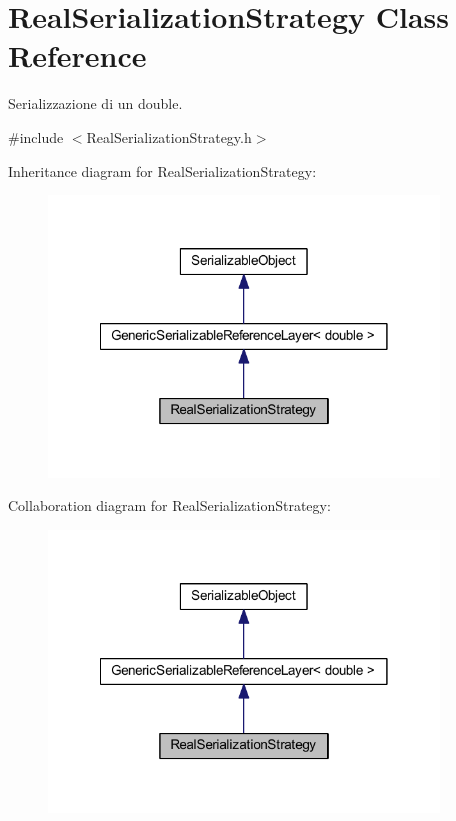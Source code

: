 \hypertarget{class_real_serialization_strategy}{
\section{RealSerializationStrategy Class Reference}
\label{class_real_serialization_strategy}
}


Serializzazione di un double.  




{\ttfamily \#include $<$RealSerializationStrategy.h$>$}



Inheritance diagram for RealSerializationStrategy:\nopagebreak
\begin{figure}[H]
\begin{center}
\leavevmode
\includegraphics[width=294pt]{class_real_serialization_strategy__inherit__graph}
\end{center}
\end{figure}


Collaboration diagram for RealSerializationStrategy:\nopagebreak
\begin{figure}[H]
\begin{center}
\leavevmode
\includegraphics[width=294pt]{class_real_serialization_strategy__coll__graph}
\end{center}
\end{figure}
